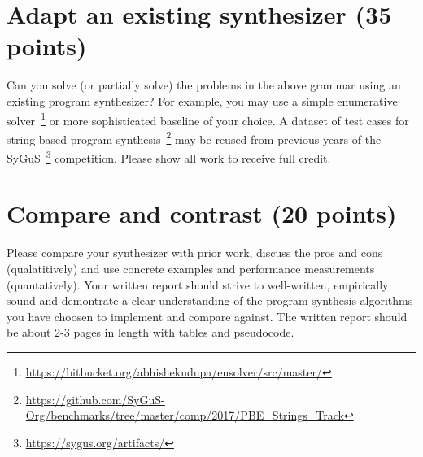 \documentclass[11pt]{article}
\begin{document}
    \section{Adapt an existing synthesizer (35 points)}

    Can you solve (or partially solve) the problems in the above grammar using an existing program synthesizer? For example, you may use a simple enumerative solver~\footnote{\url{https://bitbucket.org/abhishekudupa/eusolver/src/master/}} or more sophisticated baseline of your choice. A dataset of test cases for string-based program synthesis~\footnote{\url{https://github.com/SyGuS-Org/benchmarks/tree/master/comp/2017/PBE_Strings_Track}} may be reused from previous years of the SyGuS~\footnote{\url{https://sygus.org/artifacts/}} competition. Please show all work to receive full credit.

    \section{Compare and contrast (20 points)}

    Please compare your synthesizer with prior work, discuss the pros and cons (qualatitively) and use concrete examples and performance measurements (quantatively). Your written report should strive to well-written, empirically sound and demontrate a clear understanding of the program synthesis algorithms you have choosen to implement and compare against. The written report should be about 2-3 pages in length with tables and pseudocode.
\end{document}
